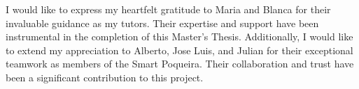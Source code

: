 I would like to express my heartfelt gratitude to Maria and Blanca for their invaluable guidance as my tutors. Their expertise and support have been instrumental in the completion of this Master's Thesis. Additionally, I would like to extend my appreciation to Alberto, Jose Luis, and Julian for their exceptional teamwork as members of the Smart Poqueira. Their collaboration and trust have been a significant contribution to this project.